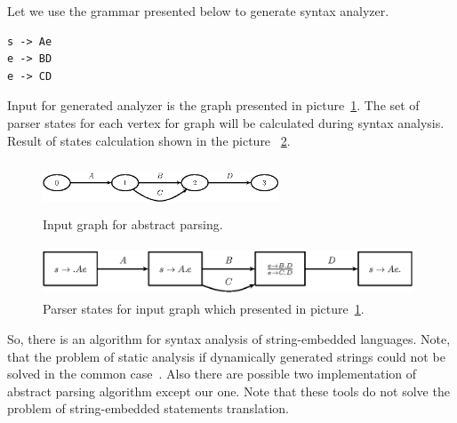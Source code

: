 Let we use the grammar presented below to generate syntax analyzer.

\begin{verbatim}
s -> Ae
e -> BD
e -> CD
\end{verbatim}

Input for generated analyzer is the graph presented in picture~\ref{pic2}. The set of parser states for each vertex for 
graph will be calculated during syntax analysis. Result of states calculation shown in the picture ~\ref{pic3}.

\begin{figure}
    \begin{center}
        \includegraphics[width=7cm,height=1.5cm]{graphs/simple_grammar_inpt.eps}
        \caption{Input graph for abstract parsing.}
        \label{pic2}
    \end{center}
\end{figure}

\begin{figure}
    \begin{center}
        \includegraphics[width=11cm,height=1.5cm]{graphs/simple_grammar_items.eps}
        \caption{Parser states for input graph which presented in picture~\ref{pic2}.}
        \label{pic3}
    \end{center}
\end{figure}

So, there is an algorithm for syntax analysis of string-embedded languages. Note, that the problem of static 
analysis if dynamically generated strings could not be solved in the common case~\cite{ALVOR2}. Also there are 
possible two implementation of abstract parsing algorithm except our one. Note that these tools do not solve 
the problem of string-embedded statements translation.


